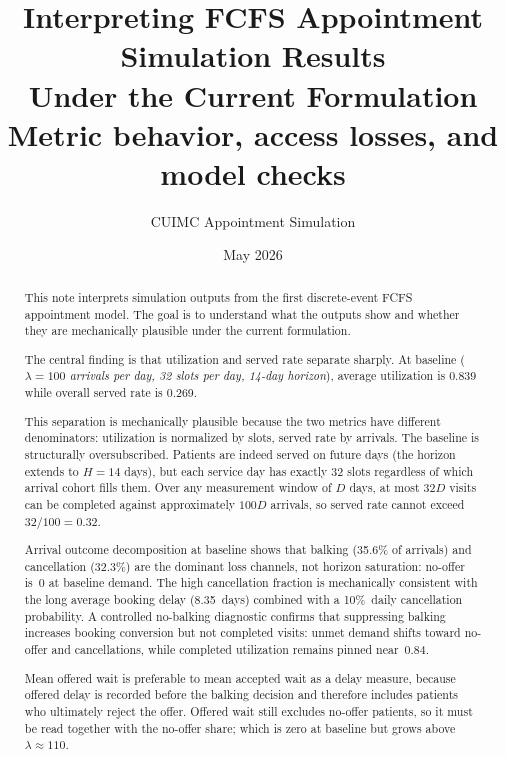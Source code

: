 \documentclass[11pt]{article}
\title{Interpreting FCFS Appointment Simulation Results\\
Under the Current Formulation\\[0.4em]
\large Metric behavior, access losses, and model checks}
\author{CUIMC Appointment Simulation}
\date{May 2026}
\begin{document}
\maketitle

\begin{abstract}
\noindent
This note interprets simulation outputs from the first discrete-event FCFS appointment
model. The goal is to understand what the outputs show and whether they are
mechanically plausible under the current formulation.


The central finding is that utilization and served rate separate sharply.
At baseline (\textit{$\lambda = 100$ arrivals per day, 32 slots per day, 14-day
horizon}), average utilization is 0.839 while overall served rate is 0.269.

This separation is mechanically plausible because the two metrics have
different denominators: utilization is normalized by slots, served rate by
arrivals. The baseline is structurally oversubscribed. Patients are indeed served
on future days (the horizon extends to $H = 14$ days), but each service day
has exactly 32 slots regardless of which arrival cohort fills them. Over
any measurement window of $D$ days, at most $32D$ visits can be completed
against approximately $100D$ arrivals, so served rate cannot exceed
$32/100 = 0.32$.

Arrival outcome decomposition at baseline shows that balking (35.6\% of
arrivals) and cancellation (32.3\%) are the dominant loss channels, not
horizon saturation: no-offer is~0 at baseline demand. The high cancellation
fraction is mechanically consistent with the long average booking delay
(8.35~days) combined with a 10\%~daily cancellation probability.
A controlled no-balking diagnostic confirms that suppressing balking
increases booking conversion but not completed visits: unmet demand shifts
toward no-offer and cancellations, while completed utilization remains
pinned near~0.84.

Mean offered wait is preferable to mean accepted wait as a delay measure,
because offered delay is recorded before the balking decision and therefore
includes patients who ultimately reject the offer. Offered wait still excludes
no-offer patients, so it must be read together with the no-offer share; which
is zero at baseline but grows above $\lambda \approx 110$.
\end{abstract}

\tableofcontents
\newpage

\end{document}
